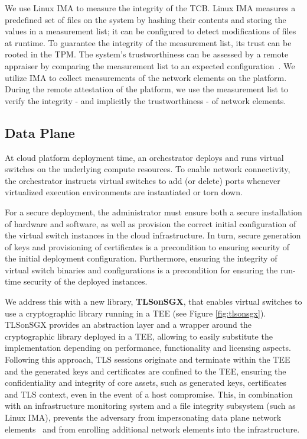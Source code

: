 {We use Linux IMA to measure the integrity of the TCB.
Linux IMA measures a predefined set of files on the system by hashing their contents and storing the values in a measurement list;
it can be configured to detect modifications of files at runtime.
To guarantee the integrity of the measurement list, its trust can be rooted in the TPM.
The system's trustworthiness can be assessed by a remote appraiser by comparing the measurement list to an expected configuration~\cite{coker:2011}.
We utilize IMA to collect measurements of the network elements on the platform.
During the remote attestation of the platform, we use the measurement list to verify the integrity - and implicitly the trustworthiness - of network elements.


\subsection{Data Plane}
\label{subsec:data-plane-trust}
At cloud platform deployment time, an orchestrator deploys and runs virtual switches on the underlying compute resources.
To enable network connectivity, the orchestrator instructs virtual switches to add (or delete) ports whenever virtualized execution environments are instantiated or torn down.

For a secure deployment, the administrator must ensure both a secure installation of hardware and software, as well as provision the correct initial configuration of the virtual switch instances in the cloud infrastructure.
In turn, secure generation of keys and provisioning of certificates is a precondition to ensuring security of the initial deployment configuration.
Furthermore, ensuring the integrity of virtual switch binaries and configurations is a precondition for ensuring the run-time security of the deployed instances. 

We address this with a new library, \textbf{TLSonSGX}, that enables virtual switches to use a cryptographic library running in a TEE (see Figure \ref{fig:tlsonsgx}).
TLSonSGX provides an abstraction layer and a wrapper around the cryptographic library deployed in a TEE, allowing to easily substitute the implementation depending on performance, functionality and licensing aspects.
Following this approach, TLS sessions originate and terminate within the TEE and the generated keys and certificates are confined to the TEE,
ensuring the confidentiality and integrity of core assets, such as generated keys, certificates and TLS context, even in the event of a host compromise.
This, in combination with an infrastructure monitoring system and a file integrity subsystem (such as Linux IMA), prevents the adversary from impersonating data plane network elements~\cite{thimmaraju:2017} and from enrolling additional network elements into the infrastructure.

}
